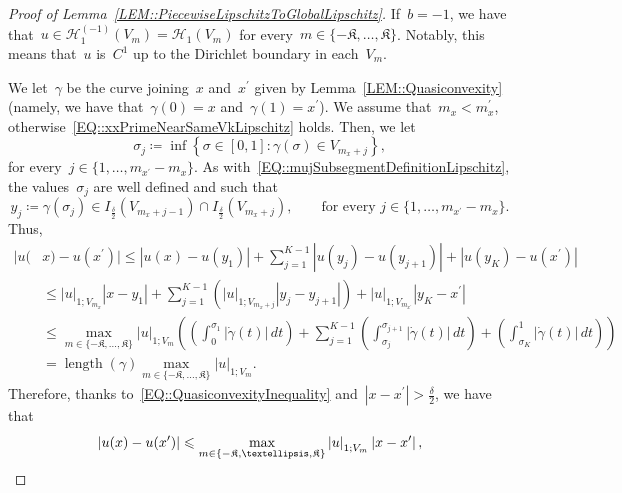 \documentclass[10pt,a4paper]{amsart}
\makeatletter
\newcommand{\abs}[1]{\left\lvert#1\right\rvert}
\newcommand{\constapp}[1]{%
  \csname constapp@#1\endcsname%
}
\renewcommand{\leq}{\leqslant}
\makeatother
\begin{document}
\begin{proof}[Proof of Lemma~\ref{LEM::PiecewiseLipschitzToGlobalLipschitz}]
    If~$b=-1$, we have that~$u \in \mathcal{H}_{1}^{(-1)}(V_m) = \mathcal{H}_{1}(V_m)$ for every~$m \in \{-\mathfrak{K},\dots,\mathfrak{K}\}$. Notably, this means that~$u$ is~$C^1$ up to the Dirichlet boundary in each~$V_m$. %

    We let~$\gamma$ be the curve joining~$x$ and~$x^\prime$ given by Lemma~\ref{LEM::Quasiconvexity} (namely, we have that~$\gamma(0) = x$ and~$\gamma(1) = x^\prime$). We assume that~$m_x < m_x^\prime$, otherwise~\eqref{EQ::xxPrimeNearSameVkLipschitz} holds. Then, we let
    \begin{equation}
        \sigma_j \coloneq \inf\left\{ \sigma \in [0,1] \colon \gamma(\sigma) \in V_{m_x+j} \right\},
    \end{equation}
    for every~$j \in \{1,\dots,m_{x^\prime}-m_x\}$. As with~\eqref{EQ::mujSubsegmentDefinitionLipschitz}, the values~$\sigma_j$ are well defined and such that
    \begin{equation}
        y_j \coloneq \gamma(\sigma_j)\in I_{\frac{\delta}{2}}(V_{m_x + j - 1})\cap I_{\frac{\delta}{2}}(V_{m_x + j}),\qquad \text{for every }j \in \{1,\dots,m_{x^\prime}-m_x\}.
    \end{equation}
    Thus,
    \begin{equation}
        \begin{split}
        |u(&x)-u(x^\prime)|\leq \abs{u(x)-u(y_1)} + \sum_{j=1}^{K-1} \abs{u(y_j)-u(y_{j+1})} + \abs{u(y_K)-u(x^\prime)}\\
            &\leq \abs{u}_{1; V_{m_x}} \abs{x-y_1} + \sum_{j=1}^{K-1} \left( \abs{u}_{1; V_{m_x+j}} \abs{y_j-y_{j+1}}\right) +\abs{u}_{1; V_{m_{x^\prime}}} \abs{y_K - x^\prime}\\
            &\leq \max_{m \in \{-\mathfrak{K},\dots,\mathfrak{K}\}} \abs{u}_{1; V_{m}} \left( {\left(\int_0^{\sigma_1}\abs{\dot{\gamma}(t)}\,dt\right)}+ \sum_{j=1}^{K-1} {\left(\int_{\sigma_j}^{\sigma_{j+1}}\abs{\dot{\gamma}(t)}\,dt\right)} + {\left(\int_{\sigma_K}^{1}\abs{\dot{\gamma}(t)}\,dt\right)}\right)\\
            & = \operatorname{length}(\gamma) \max_{m \in \{-\mathfrak{K},\dots,\mathfrak{K}\}} \abs{u}_{1; V_{m}}.
        \end{split}
    \end{equation}
    Therefore, thanks to~\eqref{EQ::QuasiconvexityInequality} and~$\abs{x-x^\prime} > \frac{\delta}{2}$, we have that
    \begin{equation}\label{OLD::EQ::xxprimeFarNegativeB}
        |u(x)-u(x^\prime)| \leq \constapp{CONST::Quasiconvexity} \max_{m \in \{-\mathfrak{K},\dots,\mathfrak{K}\}}\abs{u}_{1; V_{m}}\abs{x-x^\prime},

\end{equation}
\end{proof}
\end{document}

